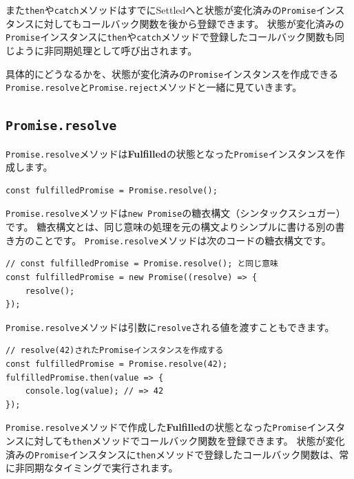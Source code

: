 また\texttt{then}や\texttt{catch}メソッドはすでにSettledへと状態が変化済みの\texttt{Promise}インスタンスに対してもコールバック関数を後から登録できます。
状態が変化済みの\texttt{Promise}インスタンスに\texttt{then}や\texttt{catch}メソッドで登録したコールバック関数も同じように非同期処理として呼び出されます。

具体的にどうなるかを、状態が変化済みの\texttt{Promise}インスタンスを作成できる\texttt{Promise.resolve}と\texttt{Promise.reject}メソッドと一緒に見ていきます。

\hypertarget{promise-resolve}{%
\subsection{\texorpdfstring{\texttt{Promise.resolve}}{Promise.resolve}}\label{promise-resolve}}

\texttt{Promise.resolve}メソッドは\textbf{Fulfilled}の状態となった\texttt{Promise}インスタンスを作成します。

\begin{lstlisting}
const fulfilledPromise = Promise.resolve();
\end{lstlisting}

\texttt{Promise.resolve}メソッドは\texttt{new Promise}の糖衣構文（シンタックスシュガー）です。
糖衣構文とは、同じ意味の処理を元の構文よりシンプルに書ける別の書き方のことです。
\texttt{Promise.resolve}メソッドは次のコードの糖衣構文です。

\begin{lstlisting}
// const fulfilledPromise = Promise.resolve(); と同じ意味
const fulfilledPromise = new Promise((resolve) => {
    resolve();
});
\end{lstlisting}

\texttt{Promise.resolve}メソッドは引数に\texttt{resolve}される値を渡すこともできます。

\begin{lstlisting}
// resolve(42)されたPromiseインスタンスを作成する
const fulfilledPromise = Promise.resolve(42);
fulfilledPromise.then(value => {
    console.log(value); // => 42
});
\end{lstlisting}

\texttt{Promise.resolve}メソッドで作成した\textbf{Fulfilled}の状態となった\texttt{Promise}インスタンスに対しても\texttt{then}メソッドでコールバック関数を登録できます。
状態が変化済みの\texttt{Promise}インスタンスに\texttt{then}メソッドで登録したコールバック関数は、常に非同期なタイミングで実行されます。

